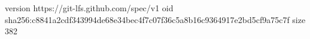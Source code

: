 version https://git-lfs.github.com/spec/v1
oid sha256:c8841a2cdf343994de68e34bec4f7c07f36c5a8b16c9364917e2bd5cf9a75c7f
size 382
